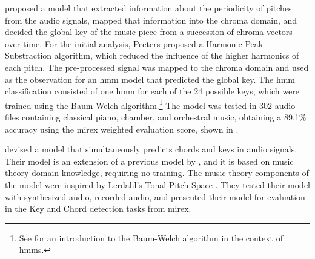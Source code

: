 \textcite{peeters2006chromabased} proposed a model that
extracted information about the periodicity of pitches from
the audio signals, mapped that information into the chroma
domain, and decided the global key of the music piece from a
succession of chroma-vectors over time. For the initial
analysis, Peeters proposed a Harmonic Peak Substraction
algorithm, which reduced the influence of the higher
harmonics of each pitch. The pre-processed signal was mapped
to the chroma domain and used as the observation for an
\gls{hmm} model that predicted the global key. The \gls{hmm}
classification consisted of one \gls{hmm} for each of the 24
possible keys, which were trained using the Baum-Welch
algorithm.\footnote{See \textcite{rabiner1989tutorial} for
an introduction to the Baum-Welch algorithm in the context
of \glspl{hmm}.} The model was tested in 302 audio files
containing classical piano, chamber, and orchestral music,
obtaining a 89.1\% accuracy using the \gls{mirex} weighted
evaluation score, shown in .





\textcite{catteau2007probabilistic} devised a model that
simultaneously predicts chords and keys in audio signals.
Their model is an extension of a previous model by
\textcite{bello2005robust}, and it is based on music theory
domain knowledge, requiring no training. The music theory
components of the model were inspired by Lerdahl's Tonal
Pitch Space \parencite{lerdahl2005tonal}. They tested their
model with synthesized audio, recorded audio, and presented
their model for evaluation in the Key and Chord detection
tasks from \gls{mirex}. 

